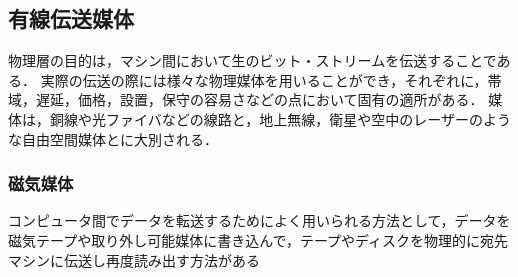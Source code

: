 \documentclass[a4paper]{ltjsarticle}
\begin{document}
  \subsection{有線伝送媒体}
    物理層の目的は，マシン間において生のビット・ストリームを伝送することである．
    実際の伝送の際には様々な物理媒体を用いることができ，それぞれに，帯域，遅延，価格，設置，保守の容易さなどの点において固有の適所がある．
    媒体は，銅線や光ファイバなどの線路と，地上無線，衛星や空中のレーザーのような自由空間媒体とに大別される．
    \subsubsection{磁気媒体}
			コンピュータ間でデータを転送するためによく用いられる方法として，データを磁気テープや取り外し可能媒体に書き込んで，テープやディスクを物理的に宛先マシンに伝送し再度読み出す方法がある
\end{document}
